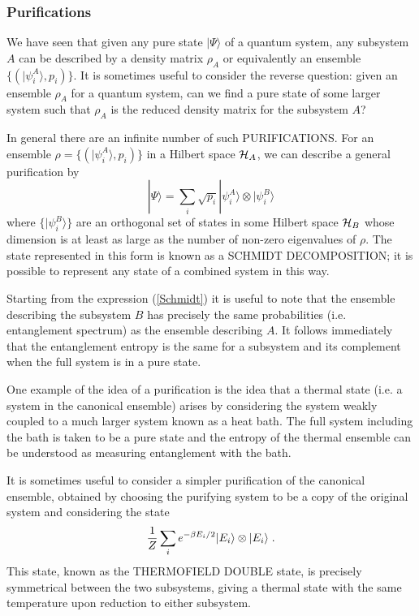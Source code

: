 \documentclass[12pt,epsf]{article}
\newcommand{\be}{\begin{equation}}
\newcommand{\ee}{\end{equation}}
\begin{document}
\subsubsection*{Purifications}

We have seen that given any pure state $|\Psi \rangle$ of a quantum system, any subsystem $A$ can be described by a density matrix $\rho_A$ or equivalently an ensemble $\{(|\psi^A_i \rangle, p_i)\}$. It is sometimes useful to consider the reverse question: given an ensemble $\rho_A$ for a quantum system, can we find a pure state of some larger system such that $\rho_A$ is the reduced density matrix for the subsystem $A$?

In general there are an infinite number of such PURIFICATIONS. For an ensemble $\rho = \{(|\psi^A_i \rangle, p_i)\}$ in a Hilbert space ${\cal H}_A$, we can describe a general purification by
\be
\label{Schmidt}
|\Psi \rangle = \sum_i \sqrt{p_i} |\psi^A_i \rangle \otimes |\psi^B_i \rangle
\ee
where $\{|\psi^B_i \rangle\}$ are an orthogonal set of states in some Hilbert space ${\cal H}_B$ whose dimension is at least as large as the number of non-zero eigenvalues of $\rho$. The state represented in this form is known as a SCHMIDT DECOMPOSITION; it is possible to represent any state of a combined system in this way.

Starting from the expression (\ref{Schmidt}) it is useful to note that the ensemble describing the subsystem $B$ has precisely the same probabilities (i.e. entanglement spectrum) as the ensemble describing $A$. It follows immediately that the entanglement entropy is the same for a subsystem and its complement when the full system is in a pure state.

One example of the idea of a purification is the idea that a thermal state (i.e. a system in the canonical ensemble) arises by considering the system weakly coupled to a much larger system known as a heat bath. The full system including the bath is taken to be a pure state and the entropy of the thermal ensemble can be understood as measuring entanglement with the bath.

It is sometimes useful to consider a simpler purification of the canonical ensemble, obtained by choosing the purifying system to be a copy of the original system and considering the state
\be
\label{TFD}
{1 \over Z} \sum_i e^{- \beta E_i /2} |E_i \rangle \otimes |E_i \rangle \; .
\ee
This state, known as the THERMOFIELD DOUBLE state, is precisely symmetrical between the two subsystems, giving a thermal state with the same temperature upon reduction to either subsystem.
\end{document}
